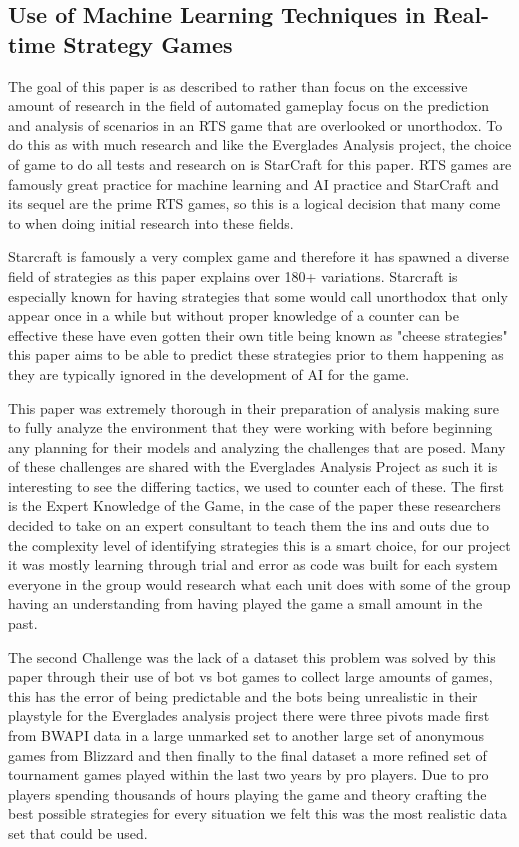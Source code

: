 \documentclass[a4paper,12pt]{report}
\begin{document}
\subsection{Use of Machine Learning Techniques in Real-time Strategy Games}

The goal of this paper is as described to rather than focus on the excessive amount of research in the field of automated gameplay focus on the prediction and analysis of scenarios in an RTS game that are overlooked or unorthodox. To do this as with much research and like the Everglades Analysis project, the choice of game to do all tests and research on is StarCraft for this paper. RTS games are famously great practice for machine learning and AI practice and StarCraft and its sequel are the prime RTS games, so this is a logical decision that many come to when doing initial research into these fields.

Starcraft is famously a very complex game and therefore it has spawned a diverse field of strategies as this paper explains over 180+ variations. Starcraft is especially known for having strategies that some would call unorthodox that only appear once in a while but without proper knowledge of a counter can be effective these have even gotten their own title being known as "cheese strategies" this paper aims to be able to predict these strategies prior to them happening as they are typically ignored in the development of AI for the game.
        	
This paper was extremely thorough in their preparation of analysis making sure to fully analyze the environment that they were working with before beginning any planning for their models and analyzing the challenges that are posed. Many of these challenges are shared with the Everglades Analysis Project as such it is interesting to see the differing tactics, we used to counter each of these. The first is the Expert Knowledge of the Game, in the case of the paper these researchers decided to take on an expert consultant to teach them the ins and outs due to the complexity level of identifying strategies this is a smart choice, for our project it was mostly learning through trial and error as code was built for each system everyone in the group would research what each unit does with some of the group having an understanding from having played the game a small amount in the past.

The second Challenge was the lack of a dataset this problem was solved by this paper through their use of bot vs bot games to collect large amounts of games, this has the error of being predictable and the bots being unrealistic in their playstyle for the Everglades analysis project there were three pivots made first from BWAPI data in a large unmarked set to another large set of anonymous games from Blizzard and then finally to the final dataset a more refined set of tournament games played within the last two years by pro players. Due to pro  players spending thousands of hours playing the game and theory crafting the best possible strategies for every situation we felt this was the most realistic data set that could be used.
\end{document}
